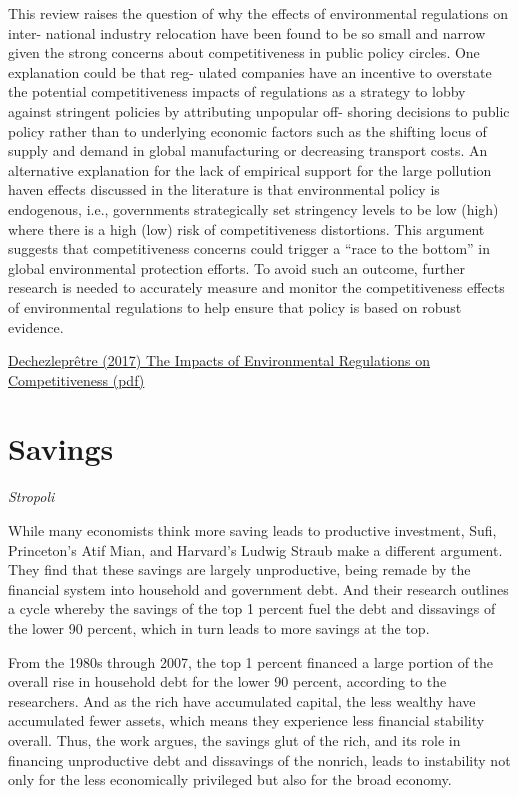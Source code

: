\documentclass[
]{book}
\begin{document}
This review raises the question of why the effects of environmental regulations on inter-
national industry relocation have been found to be so small and narrow given the strong
concerns about competitiveness in public policy circles. One explanation could be that reg-
ulated companies have an incentive to overstate the potential competitiveness impacts of
regulations as a strategy to lobby against stringent policies by attributing unpopular off-
shoring decisions to public policy rather than to underlying economic factors such as the
shifting locus of supply and demand in global manufacturing or decreasing transport costs.
An alternative explanation for the lack of empirical support for the large pollution haven
effects discussed in the literature is that environmental policy is endogenous, i.e., governments
strategically set stringency levels to be low (high) where there is a high (low) risk of
competitiveness distortions. This argument suggests that competitiveness concerns could
trigger a ``race to the bottom'' in global environmental protection efforts. To avoid such an
outcome, further research is needed to accurately measure and monitor the competitiveness
effects of environmental regulations to help ensure that policy is based on robust evidence.

\href{pdf/Dechezlepretre_2017_Impacts_of_Env_Regs_on_Compete.pdf}{Dechezleprêtre (2017) The Impacts of Environmental Regulations on Competitiveness (pdf)}

\hypertarget{savings}{%
\chapter{Savings}\label{savings}}

\emph{Stropoli}

While many economists think more saving leads to productive investment, Sufi, Princeton's Atif Mian, and Harvard's Ludwig Straub make a different argument. They find that these savings are largely unproductive, being remade by the financial system into household and government debt. And their research outlines a cycle whereby the savings of the top 1 percent fuel the debt and dissavings of the lower 90 percent, which in turn leads to more savings at the top.

From the 1980s through 2007, the top 1 percent financed a large portion of the overall rise in household debt for the lower 90 percent, according to the researchers. And as the rich have accumulated capital, the less wealthy have accumulated fewer assets, which means they experience less financial stability overall. Thus, the work argues, the savings glut of the rich, and its role in financing unproductive debt and dissavings of the nonrich, leads to instability not only for the less economically privileged but also for the broad economy.
\end{document}
